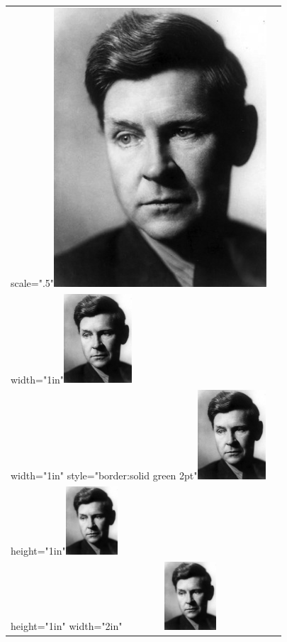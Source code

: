 \documentclass[11pt,twoside]{article}\makeatletter
\begin{document}
\begin{longtable}{P{0.19558457711442787\textwidth}P{0.6544154228855721\textwidth}}
scale=".5"\tabcellsep \noindent\includegraphics[scale=.5,]{portrait.jpg}\\
width="1in"\tabcellsep \noindent\includegraphics[width=1in,]{portrait.jpg}\\
width="1in" style="border:solid green 2pt"\tabcellsep \noindent\includegraphics[width=1in,]{portrait.jpg}\\
height="1in"\tabcellsep \noindent\includegraphics[height=1in,]{portrait.jpg}\\
height="1in" width="2in"\tabcellsep \noindent\includegraphics[width=2in,height=1in,]{portrait.jpg}\\

\end{longtable}
\end{document}
